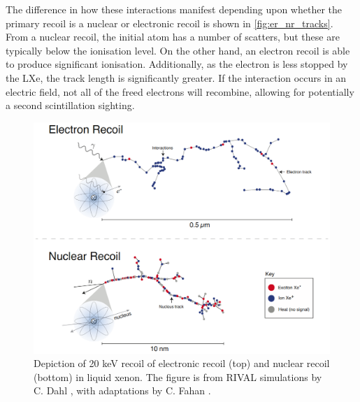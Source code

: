 \par
The difference in how these interactions manifest depending upon whether the primary recoil is a nuclear or electronic recoil is shown in \autoref{fig:er_nr_tracks}.
From a nuclear recoil, the initial atom has a number of scatters, but these are typically below the ionisation level.
On the other hand, an electron recoil is able to produce significant ionisation.
Additionally, as the electron is less stopped by the LXe, the track length is significantly greater.
If the interaction occurs in an electric field, not all of the freed electrons will recombine, allowing for potentially a second scintillation sighting.

\begin{figure}
    \centering
    \includegraphics[width=\textwidth]{Figures/LZ/er_nr_tracks.png}
    \caption[Depiction of a 20 keV recoil on liquid xenon]{Depiction of 20 keV recoil of electronic recoil (top) and nuclear recoil (bottom) in liquid xenon.
    The figure is from RIVAL simulations by C. Dahl \cite{carldahl_thesis_ref}, with adaptations by C. Fahan \cite{carlosfahan_thesis_ref}.}
    \label{fig:er_nr_tracks}
\end{figure}

